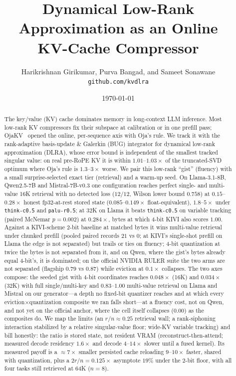 \documentclass[11pt]{article}
\title{Dynamical Low-Rank Approximation as an Online\\ KV-Cache Compressor}
\author{Harikrishnan Girikumar, Purva Bangad, and Sameet Sonawane\\ \texttt{github.com/kvdlra}}
\date{\today}
\begin{document}
\maketitle

\begin{abstract}
The key/value (KV) cache dominates memory in long-context LLM inference. Most
low-rank KV compressors fix their subspace at calibration or in one prefill pass;
OjaKV~\citep{zhu2025ojakv} opened the online, per-sequence axis with Oja's rule. We
track it with the rank-adaptive basis-update \& Galerkin (BUG) integrator for
dynamical low-rank approximation (DLRA), whose error bound is independent of the
smallest tracked singular value: on real pre-RoPE KV it is within
$1.01$--$1.03\times$ of the truncated-SVD optimum where Oja's rule is
$1.3$--$3\times$ worse. We pair this low-rank ``gist'' (fluency) with a small
surprise-selected exact tier (retrieval) and a warm-up seed. On Llama-3.1-8B,
Qwen2.5-7B and Mistral-7B-v0.3 one configuration reaches perfect single- and
multi-value 16K retrieval with no detected loss ($12/12$, Wilson lower bound
$0.758$) at $0.15$--$0.28\times$ honest fp32-at-rest stored state
($0.085$--$0.149\times$ float-equivalent), $1.8$--$5\times$ under
\texttt{think-c0.5} and \texttt{palu-r0.5}; at 32K on Llama it beats
\texttt{think-c0.5} on variable tracking (paired McNemar $p{=}0.002$) at
$0.284\times$, bytes at which 4-bit KIVI also scores $1.00$. Against a KIVI-scheme
2-bit baseline at matched bytes it wins multi-value retrieval under chunked
prefill (pooled paired records $21$ vs $0$; at KIVI's single-shot prefill on Llama
the edge is not separated) but trails or ties on fluency; 4-bit quantization at twice the
bytes is not separated from it, and on Qwen, where the gist's bytes already equal
4-bit's, it is dominated; on the official NVIDIA RULER suite the two arms are not
separated (flagship $0.79$ vs $0.87$) while eviction at $0.1\times$ collapses. The
two axes compose: the seeded gist with 4-bit coordinates reaches $0.048\times$
(16K) and $0.034\times$ (32K) with full single/multi-key and $0.83$--$1.00$
multi-value retrieval on Llama and Mistral on our generator---a depth no fixed-bit
quantizer reaches and at which every eviction$\times$quantization composite we ran
falls short---at a fluency cost, not on Qwen, and not yet on the official anchor,
where the cell itself collapses ($0.00$) as the composites do. We map the limits (an $r/n\approx0.25$ retrieval wall; a rank-siphoning
interaction stabilized by a relative singular-value floor; wide-KV variable
tracking) and bill honestly: the ratio is stored state, not resident VRAM
(reconstruct-then-attend; measured decode residency $1.6\times$ and decode
$4$--$14\times$ slower until a fused kernel). Its measured payoff is a $\approx7\times$ smaller persisted cache
reloading $9$--$10\times$ faster, shared with quantization, plus a
$2r/n=0.125\times$ asymptote $19\%$ under the 2-bit floor, with all four tasks
still retrieved at 64K ($n{=}8$).
\end{abstract}
\end{document}
